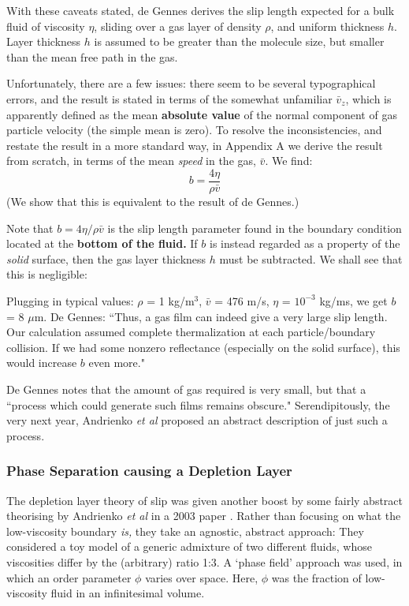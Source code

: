 \documentclass[12pt, a4paper, twoside, openright]{book}
\begin{document}
With these caveats stated, de Gennes derives the slip length expected for a bulk fluid of viscosity $\eta$, sliding over a gas layer of density $\rho$, and uniform thickness $h$. Layer thickness $h$ is assumed to be greater than the molecule size, but smaller than the mean free path in the gas.

Unfortunately, there are a few issues: there seem to be several typographical errors, and the result is stated in terms of the somewhat unfamiliar $\bar{v}_{z}$, which is apparently defined as the mean \textbf{absolute value} of the normal component of gas particle velocity (the simple mean is zero).  To resolve the inconsistencies, and restate the result in a more standard way, in Appendix A we derive the result from scratch, in terms of the mean \emph{speed} in the gas, $\bar{v}$.  We find:
\begin{equation}
b = \frac{4 \eta}{\rho \bar{v}}
\end{equation}
(We show that this is equivalent to the result of de Gennes.)

Note that $b = 4 \eta/ \rho \bar{v}$ is the slip length parameter found in the boundary condition located at the \textbf{bottom of the fluid.}  If $b$ is instead regarded as a property of the \emph{solid} surface, then the gas layer thickness $h$ must be subtracted.  We shall see that this is negligible:

Plugging in typical values: $\rho$ = 1 kg/m$^{3}$, $\bar{v}$ = 476 m/s, $\eta$ = $10^{-3}$ kg/ms, we get $b$ = 8 $\mu$m. De Gennes: ``Thus, a gas film can indeed give a very large slip length.  Our calculation assumed complete thermalization at each particle/boundary collision.  If we had some nonzero reflectance (especially on the solid surface), this would increase $b$ even more."

De Gennes notes that the amount of gas required is very small, but that a ``process which could generate such films remains obscure."  Serendipitously, the very next year, Andrienko \emph{et al} proposed an abstract description of just such a process.

\clearpage
\subsubsection*{Phase Separation causing a Depletion Layer}

The depletion layer theory of slip was given another boost by some fairly abstract theorising by Andrienko \emph{et al} in a 2003 paper \cite{Andrienko2003}.  Rather than focusing on what the low-viscosity boundary \emph{is,} they take an agnostic, abstract approach: They considered a toy model of a generic admixture of two different fluids, whose viscosities differ by the (arbitrary) ratio 1:3.  A `phase field' approach was used, in which an order parameter $\phi$ varies over space.  Here, $\phi$ was the fraction of low-viscosity fluid in an infinitesimal volume.
\end{document}
